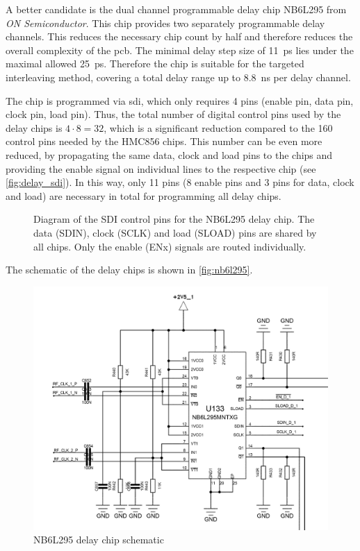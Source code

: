 A better candidate is the dual channel programmable delay chip NB6L295 from \textit{ON Semiconductor}. 
This chip provides two separately programmable delay channels. 
This reduces the necessary chip count by half and therefore reduces the overall complexity of the \gls{pcb}.
The minimal delay step size of \SI{11}{\pico\second} lies under the maximal allowed \SI{25}{\pico \second}. Therefore the chip is suitable for the targeted interleaving method, covering a total delay range up to \SI{8.8}{\nano\second} per delay channel.

The chip is programmed via \gls{sdi}, which only requires 4 pins (enable pin, data pin, clock pin, load pin). 
Thus, the total number of digital control pins used by the delay chips is $4\cdot8 = 32$, which is a significant reduction compared to the 160 control pins needed by the HMC856 chips. 
This number can be even more reduced, by propagating the same data, clock and load pins to the chips and providing the enable signal on individual lines to the respective chip (see \autoref{fig:delay_sdi}). 
In this way, only 11 pins (8 enable pins and 3 pins for data, clock and load) are necessary in total for programming all delay chips. 

\begin{figure}[tbh]
	\centering
	\resizebox{1\textwidth}{!}{}
	\caption[Delay chip SDI connections]{Diagram of the SDI control pins for the NB6L295 delay chip. The data (SDIN), clock (SCLK) and load (SLOAD) pins are shared by all chips. Only the enable (ENx) signals are routed individually.}
	\label{fig:delay_sdi}
\end{figure}

The schematic of the delay chips is shown in \autoref{fig:nb6l295}.
\begin{figure}[tbh]
	\centering
	\includegraphics[width = \textwidth]{chap/04-theresa/img/schematic/delay_chip}
	\caption{NB6L295 delay chip schematic}
	\label{fig:nb6l295}
\end{figure}

